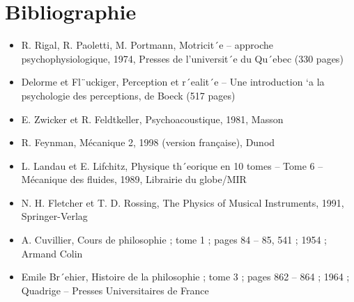 \chapter*{Bibliographie}
\begin{itemize}
    \item R. Rigal, R. Paoletti, M. Portmann, Motricit´e – approche psychophysiologique, 1974, Presses de l’universit´e du Qu´ebec (330 pages) \newline
    \item Delorme et Fl¨uckiger, Perception et r´ealit´e – Une introduction `a la psychologie des perceptions, de Boeck (517 pages) \newline
    \item E. Zwicker et R. Feldtkeller, Psychoacoustique, 1981, Masson \newline
    \item R. Feynman, Mécanique 2, 1998 (version française), Dunod \newline
    \item L. Landau et E. Lifchitz, Physique th´eorique en 10 tomes – Tome 6 – Mécanique des fluides, 1989, Librairie du globe/MIR \newline
    \item N. H. Fletcher et T. D. Rossing, The Physics of Musical Instruments, 1991, Springer-Verlag \newline
    \item A. Cuvillier, Cours de philosophie ; tome 1 ; pages 84 – 85, 541 ; 1954 ; Armand Colin \newline
    \item Emile Br´ehier, Histoire de la philosophie ; tome 3 ; pages 862 – 864 ; 1964 ; Quadrige – Presses Universitaires de France
\end{itemize}